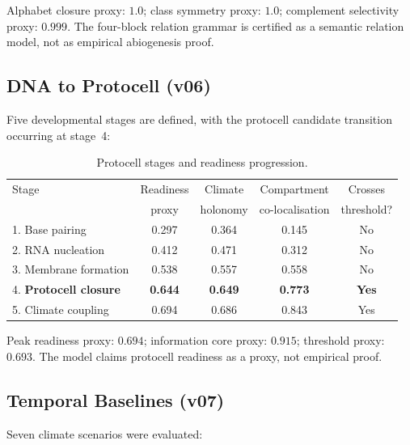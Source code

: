 \documentclass[11pt,a4paper]{article}
\begin{document}
Alphabet closure proxy: $1.0$; class symmetry proxy: $1.0$; complement selectivity proxy: $0.999$. The four-block relation grammar is certified as a semantic relation model, not as empirical abiogenesis proof.

\subsection{DNA to Protocell (v06)}

Five developmental stages are defined, with the protocell candidate transition occurring at stage~4:

\begin{table}[h]
\centering
\begin{tabular}{lcccc}
\toprule
Stage & Readiness & Climate & Compartment & Crosses \\
 & proxy & holonomy & co-localisation & threshold? \\
\midrule
1. Base pairing & 0.297 & 0.364 & 0.145 & No \\
2. RNA nucleation & 0.412 & 0.471 & 0.312 & No \\
3. Membrane formation & 0.538 & 0.557 & 0.558 & No \\
4. \textbf{Protocell closure} & \textbf{0.644} & \textbf{0.649} & \textbf{0.773} & \textbf{Yes} \\
5. Climate coupling & 0.694 & 0.686 & 0.843 & Yes \\
\bottomrule
\end{tabular}
\caption{Protocell stages and readiness progression.}
\label{tab:protocell}
\end{table}

Peak readiness proxy: $0.694$; information core proxy: $0.915$; threshold proxy: $0.693$. The model claims protocell readiness as a proxy, not empirical proof.

\subsection{Temporal Baselines (v07)}

Seven climate scenarios were evaluated:
\end{document}
